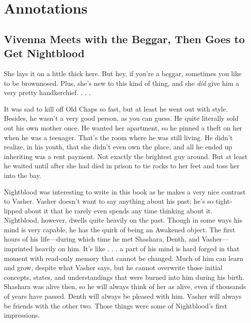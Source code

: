 \section*{Annotations}

\subsection*{Vivenna Meets with the Beggar, Then Goes to Get Nightblood}

She lays it on a little thick here. But hey, if you’re a beggar, sometimes you like to be brownnosed. Plus, she’s new to this kind of thing, and she \textit{did} give him a very pretty handkerchief. . . .

It was sad to kill off Old Chaps so fast, but at least he went out with style. Besides, he wasn’t a very good person, as you can guess. He quite literally sold out his own mother once. He wanted her apartment, so he pinned a theft on her when he was a teenager. That’s the room where he was still living. He didn’t realize, in his youth, that she didn’t even own the place, and all he ended up inheriting was a rent payment. Not exactly the brightest guy around. But at least he waited until after she had died in prison to tie rocks to her feet and toss her into the bay.

Nightblood was interesting to write in this book as he makes a very nice contrast to Vasher. Vasher doesn’t want to say anything about his past; he’s so tight-lipped about it that he rarely even spends any time thinking about it. Nightblood, however, dwells quite heavily on the past. Though in some ways his mind is very capable, he has the quirk of being an Awakened object. The first hours of his life—during which time he met Shashara, Denth, and Vasher—imprinted heavily on him. It’s like . . . a part of his mind is hard forged in that moment with read-only memory that cannot be changed. Much of him can learn and grow, despite what Vasher says, but he cannot overwrite those initial concepts, states, and understandings that were burned into him during his birth. Shashara was alive then, so he will always think of her as alive, even if thousands of years have passed. Denth will always be pleased with him. Vasher will always be friends with the other two. Those things were some of Nightblood’s first impressions.

